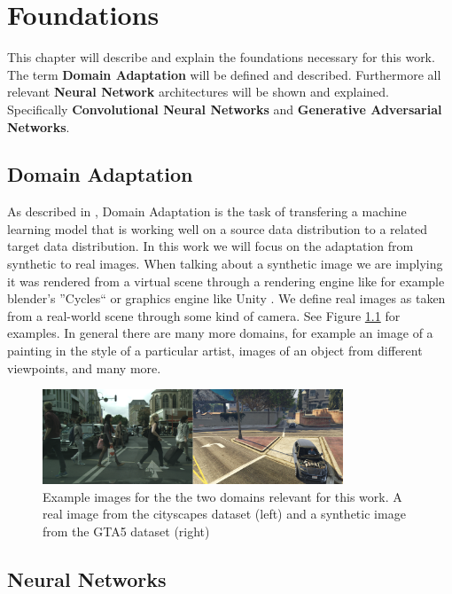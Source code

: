 \chapter{Foundations}
\label{sec:foundations}

This chapter will describe and explain the foundations necessary for this work. The term \textbf{Domain Adaptation} will be defined and described. Furthermore all relevant \textbf{Neural Network} architectures will be shown and explained. Specifically \textbf{Convolutional Neural Networks} and \textbf{Generative Adversarial Networks}.


\section{Domain Adaptation}
As described in \cite{DBLP:journals/corr/Csurka17},
Domain Adaptation is the task of transfering a machine learning model that is working well on a source data distribution to a related target data distribution. In this work we will focus on the adaptation from synthetic to real images. When talking about a synthetic image we are implying it was rendered from a virtual scene through a rendering engine like for example blender's ''Cycles`` \cite{Cycles} or graphics engine like Unity \cite{Unity}. We define real images as taken from a real-world scene through some kind of camera. See Figure \ref{fig:DA_examples} for examples. In general there are many more domains, for example an image of a painting in the style of a particular artist, images of an object from different viewpoints, and many more. 

\begin{figure}
	\centering
	 \includegraphics[width=0.8\textwidth]{../images/DA_examples_cityscapes_gta.png}
	\caption{Example images for the the two domains relevant for this work. A real image from the cityscapes dataset \cite{Cordts_2016_CVPR} (left) and a synthetic image from the GTA5 dataset \cite{Richter_2016_ECCV} (right)}
	\label{fig:DA_examples}
\end{figure}

\section{Neural Networks}

